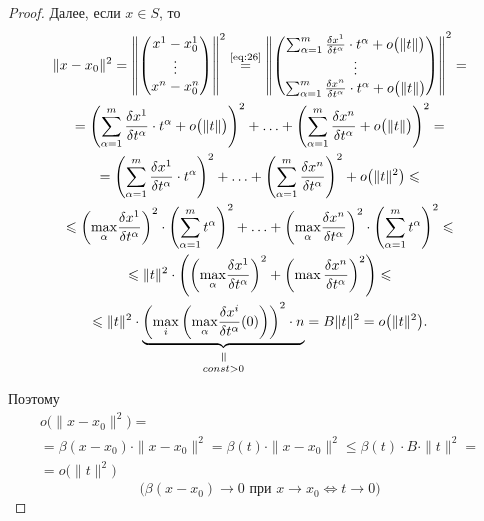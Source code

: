 \begin{proof}
    Далее, если $x\in S$, то
    \begin{multline*}
        \|x-x_0\|^2 = \left\|\left(\begin{matrix}
                x^1 - x_0^1 \\
                \vdots      \\
                x^n - x^n_0
            \end{matrix}\right)\right\|^2 \overset{\text{\ref{eq:26}}}{=} \left\|\left(\begin{matrix}
                \sum_{\alpha=1}^{m}\frac{\delta x^1}{\delta t^\alpha}\cdot t^\alpha + o\big(\|t\|\big) \\
                \vdots                                                                                 \\
                \sum_{\alpha=1}^{m}\frac{\delta x^n}{\delta t^\alpha}\cdot t^\alpha + o\big(\|t\|\big)
            \end{matrix}\right)\right\|^2 = \\
        = \left(\sum_{\alpha = 1}^{m}\frac{\delta x^1}{\delta t^\alpha}\cdot t^\alpha + o\big(\|t\|\big)\right)^2 + \ldots + \left(\sum_{\alpha=1}^{m}\frac{\delta x^n}{\delta t^\alpha} + o\big(\|t\|\big)\right)^2 =\\
        = \left(\sum_{\alpha = 1}^{m}\frac{\delta x^1}{\delta t^\alpha}\cdot t^\alpha \right)^2 + \ldots + \left(\sum_{\alpha=1}^{m}\frac{\delta x^n}{\delta t^\alpha} \right)^2 + o\big(\|t\|^2\big) \leqslant \\
        \leqslant \left( \underset{\alpha}{\max}\frac{\delta x^1}{\delta t^\alpha}\right)^2 \cdot \left(\sum_{\alpha=1}^{m} t^\alpha\right)^2 + \ldots + \left(\underset{\alpha}{\max}\frac{\delta x^n}{\delta t^\alpha}\right)^2\cdot\left(\sum_{\alpha=1}^{m}t^\alpha\right)^2 \leqslant \\
        \leqslant \|t\|^2 \cdot \left(\left(\underset{\alpha}{\max}\frac{\delta x^1}{\delta t^\alpha}\right)^2 + \left(\max \frac{\delta x^n}{\delta t^\alpha}\right)^2\right) \leqslant \\
        \leqslant \|t\|^2 \cdot \equalto{\underbrace{\left(\underset{i}{\max}\left(\underset{\alpha}{\max}\frac{\delta x^i}{\delta t^\alpha}(0)\right)\right)^2 \cdot n}}{const>0} = B\|t\|^2 = o\big(\|t\|^2\big).
    \end{multline*}

    Поэтому
    \begin{multline*}
        o\big(\|x-x_0\|^2\big) = \\
        = \beta(x-x_0)\cdot \|x-x_0\|^2 = \beta(t)\cdot \|x-x_0\|^2 \leqslant \beta(t) \cdot B \cdot \|t\|^2 = \\
        = o\big(\|t\|^2\big)
    \end{multline*}
    \[
        \big(\beta(x-x_0)\rightarrow0\text{ при }x \rightarrow x_0 \iff t \rightarrow 0\big)
    \]
\end{proof}

